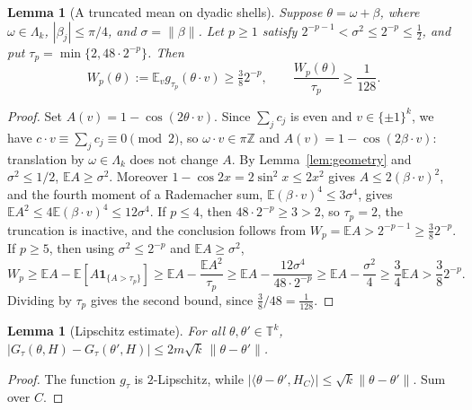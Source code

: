 \documentclass[11pt,reqno]{amsart}
\theoremstyle{plain}
\newtheorem{lemma}[theorem]{Lemma}
\theoremstyle{definition}
\theoremstyle{remark}
\newcommand{\T}{\mathbb T}
\newcommand{\Z}{\mathbb Z}
\begin{document}
\begin{lemma}[A truncated mean on dyadic shells]\label{lem:shells}
Suppose \(\theta=\omega+\beta\), where \(\omega\in\Lambda_k\),
\(|\beta_j|\le\pi/4\), and \(\sigma=\|\beta\|\). Let \(p\ge1\) satisfy
\(2^{-p-1}<\sigma^2\le2^{-p}\le\tfrac12\), and put
\(\tau_p=\min\{2,48\cdot2^{-p}\}\). Then
\[
  W_p(\theta):=\mathbb E_vg_{\tau_p}(\theta\cdot v)\ge\tfrac382^{-p},
  \qquad \frac{W_p(\theta)}{\tau_p}\ge\frac1{128}.
\]
\end{lemma}

\begin{proof}
Set \(A(v)=1-\cos(2\theta\cdot v)\). Since \(\sum_jc_j\) is even and
\(v\in\{\pm1\}^k\), we have \(c\cdot v\equiv\sum_jc_j\equiv0\pmod2\), so
\(\omega\cdot v\in\pi\Z\) and \(A(v)=1-\cos(2\beta\cdot v)\): translation by
\(\omega\in\Lambda_k\) does not change \(A\). By Lemma~\ref{lem:geometry} and
\(\sigma^2\le1/2\), \(\mathbb EA\ge\sigma^2\). Moreover
\(1-\cos2x=2\sin^2x\le2x^2\) gives \(A\le2(\beta\cdot v)^2\), and the fourth
moment of a Rademacher sum, \(\mathbb E(\beta\cdot v)^4\le3\sigma^4\), gives
\(\mathbb EA^2\le4\mathbb E(\beta\cdot v)^4\le12\sigma^4\).
If \(p\le4\), then \(48\cdot2^{-p}\ge3>2\), so \(\tau_p=2\), the truncation is
inactive, and the conclusion follows from
\(W_p=\mathbb EA>2^{-p-1}\ge\tfrac382^{-p}\). If \(p\ge5\), then using
\(\sigma^2\le2^{-p}\) and \(\mathbb EA\ge\sigma^2\),
\[
  W_p\ge\mathbb EA-\mathbb E[A\mathbf 1_{\{A>\tau_p\}}]
  \ge\mathbb EA-\frac{\mathbb EA^2}{\tau_p}
  \ge\mathbb EA-\frac{12\sigma^4}{48\cdot2^{-p}}
  \ge\mathbb EA-\frac{\sigma^2}4
  \ge\frac34\mathbb EA>\frac382^{-p}.
\]
Dividing by \(\tau_p\) gives the second bound, since
\(\tfrac38/48=\tfrac1{128}\).
\end{proof}

\begin{lemma}[Lipschitz estimate]\label{lem:lipschitz}
For all \(\theta,\theta'\in\T^k\),
\(|G_\tau(\theta,H)-G_\tau(\theta',H)|\le2m\sqrt k\,\|\theta-\theta'\|\).
\end{lemma}

\begin{proof}
The function \(g_\tau\) is \(2\)-Lipschitz, while
\(|\langle\theta-\theta',H_C\rangle|\le\sqrt k\|\theta-\theta'\|\). Sum over
\(C\).
\end{proof}
\end{document}
